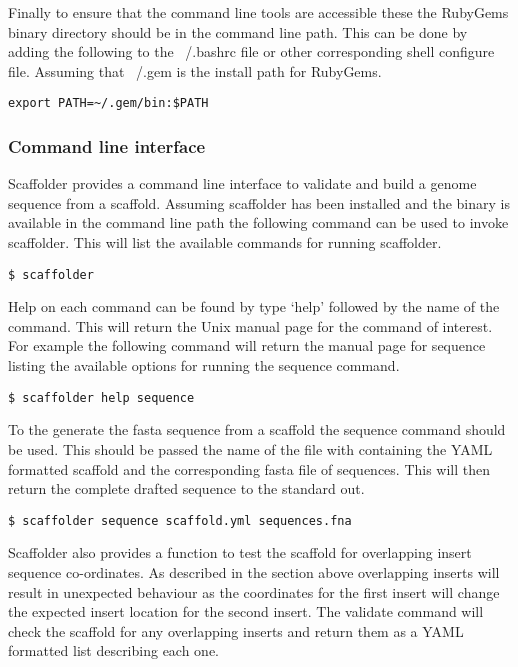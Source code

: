 \documentclass[10pt]{bmc_article}
\newenvironment{bmcformat}{\begin{raggedright}\baselineskip20pt\sloppy\setboolean{publ}{false}}{\end{raggedright}\baselineskip20pt\sloppy}
\begin{document}
\begin{bmcformat}
Finally to ensure that the command line tools are accessible these the
RubyGems binary directory should be in the command line path. This can be done
by adding the following to the ~/.bashrc file or other corresponding shell
configure file. Assuming that ~/.gem is the install path for RubyGems.

\begin{verbatim}
export PATH=~/.gem/bin:$PATH
\end{verbatim}

\subsubsection*{Command line interface} %

Scaffolder provides a command line interface to validate and build a genome
sequence from a scaffold. Assuming scaffolder has been installed and the
binary is available in the command line path the following command can be used
to invoke scaffolder. This will list the available commands for running
scaffolder. \pb

\begin{verbatim}
$ scaffolder
\end{verbatim}

Help on each command can be found by type `help' followed by the name of the
command. This will return the Unix manual page for the command of interest.
For example the following command will return the manual page for sequence
listing the available options for running the sequence command. \pb

\begin{verbatim}
$ scaffolder help sequence
\end{verbatim} 

To the generate the fasta sequence from a scaffold the sequence command should
be used. This should be passed the name of the file with containing the YAML
formatted scaffold and the corresponding fasta file of sequences. This will
then return the complete drafted sequence to the standard out. \pb

\begin{verbatim}
$ scaffolder sequence scaffold.yml sequences.fna
\end{verbatim}

Scaffolder also provides a function to test the scaffold for overlapping
insert sequence co-ordinates. As described in the section above overlapping
inserts will result in unexpected behaviour as the coordinates for the first
insert will change the expected insert location for the second insert. The
validate command will check the scaffold for any overlapping inserts and
return them as a YAML formatted list describing each one. \pb


\end{bmcformat}
\end{document}
